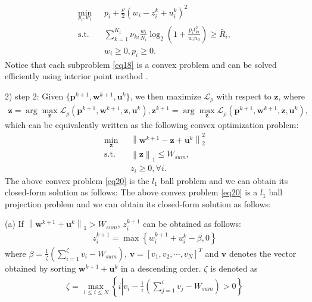 \documentclass[journal]{IEEEtran}
\begin{document}
\begin{IEEEkeywords}
\begin{subequations}
\begin{align}
	\min_{p_i, w_i}\ & p_i + \frac{\rho}{2}\left(w_i - z_i^k + u_i^k \right)^2  \label{q18a} \\ \mbox{s.t.} \quad & \sum\limits_{k = 1}^{K_i}\nu_{ki}\frac{w_i}{N_i}\log_2\left(1 + \frac{p_it_{ki}^2}{w_in_0}\right) \geq \bar{R}_i,  \label{q18b} \\
	& w_i\geq 0, p_i \geq 0. \label{q18c}
	\end{align}
\end{subequations}
Notice that each subproblem \eqref{eq18} is a convex problem and can be solved efficiently using interior point method \cite{SBoyd3}.

2) step 2: Given $\{\mathbf{p}^{k+1}, \mathbf{w}^{k+1}, \mathbf{u}^k\}$, we then maximize $\mathcal{L}_\rho$ with respect to $\mathbf{z}$, where
\begin{align}
\mathbf{z} = \arg \max_{\mathbf{z}} \mathcal{L}_\rho\left(\mathbf{p}^{k+1}, \mathbf{w}^{k+1}, \mathbf{z}, \mathbf{u}^k\right),
\mathbf{z}^{k+1} = \arg \max_{\mathbf{z}} \mathcal{L}_\rho\left(\mathbf{p}^{k+1}, \mathbf{w}^{k+1}, \mathbf{z}, \mathbf{u}^k\right),
\end{align} 
which can be equivalently written as the following convex optimization problem: 
\begin{subequations}\label{eq20}
	\begin{align}
	\min_{\mathbf{z}}\ & \left\|\mathbf{w}^{k+1} - \mathbf{z} + \mathbf{u}^k \right\|_2^2 \label{q20a} \\ \mbox{s.t.} \quad & \left\|\mathbf{z} \right\|_1 \leq W_{sum},  \label{q20b} \\
	& z_i\geq 0, \forall i. \label{q20c}
	\end{align}
\end{subequations}
The above convex problem \eqref{eq20} is the $l_1$ ball problem \cite{JDuchi} and we can obtain its closed-form solution as follows:
The above convex problem \eqref{eq20} is a  $l_1$ ball projection problem \cite{JDuchi} and we can obtain its closed-form solution as follows:

(a) If $\left\|\mathbf{w}^{k+1} + \mathbf{u}^k \right\|_1 > W_{sum}$, $z_i^{k+1}$ can be obtained as follows:
\begin{align} \label{q21}
z_i^{k+1} = \max\left\{w_i^{k+1} + u_i^k - \beta, 0\right\}
\end{align}
where $\beta = \frac{1}{\zeta}\left(\sum\limits_{i = 1}^{\zeta} v_i - W_{sum} \right)$, $\mathbf{v} = \left[v_1, v_2, \cdots, v_N\right]^T$ and $\mathbf{v}$ denotes the vector obtained by sorting $\mathbf{w}^{k+1} + \mathbf{u}^k$ in a descending order. $\zeta$ is denoted as 
\begin{align}
\zeta = \max_{1 \leq i \leq N} \left\{ i \left| v_i - \frac{1}{i}\left(\sum\limits_{j = 1}^{i} v_j - W_{sum}\right) > 0 \right. \right\}
\end{align}


\end{IEEEkeywords}
\end{document}
